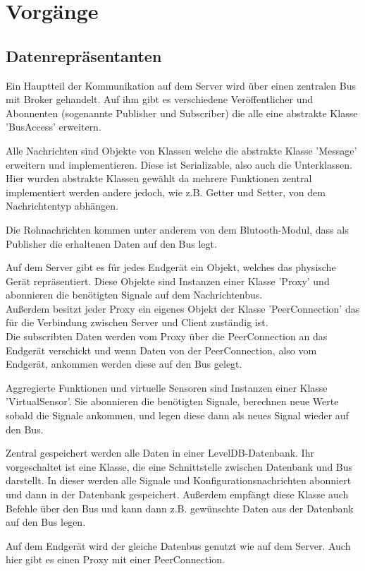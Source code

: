 \documentclass[entwurf.tex]{subfiles}
\begin{document}
\chapter{Vorgänge}
\section{Datenrepräsentanten}
Ein Hauptteil der Kommunikation auf dem Server wird über einen zentralen Bus mit Broker gehandelt. Auf ihm gibt es verschiedene Veröffentlicher und Abonnenten (sogenannte Publisher und Subscriber) die alle  eine abstrakte Klasse 'BusAccess' erweitern.

Alle Nachrichten sind Objekte von Klassen welche die abstrakte Klasse 'Message' erweitern und implementieren. Diese ist Serializable, also auch die Unterklassen. Hier wurden abstrakte Klassen gewählt da mehrere Funktionen zentral implementiert werden andere jedoch, wie z.B. Getter und Setter, von dem Nachrichtentyp abhängen.  

Die Rohnachrichten kommen unter anderem von dem Blutooth-Modul, dass als Publisher die erhaltenen Daten auf den Bus legt.

Auf dem Server gibt es für jedes Endgerät ein Objekt, welches das physische Gerät repräsentiert. Diese Objekte sind Instanzen einer Klasse 'Proxy' und abonnieren die benötigten Signale auf dem Nachrichtenbus. \\
Außerdem besitzt jeder Proxy ein eigenes Objekt der Klasse 'PeerConnection' das für die Verbindung zwischen Server und Client zuständig ist. \\
Die subscribten Daten werden vom Proxy über die PeerConnection an das Endgerät verschickt und wenn Daten von der PeerConnection, also vom Endgerät, ankommen werden diese auf den Bus gelegt.

Aggregierte Funktionen und virtuelle Sensoren sind Instanzen einer Klasse 'VirtualSensor'. Sie abonnieren die benötigten Signale, berechnen neue Werte sobald die Signale ankommen, und legen diese dann als neues Signal wieder auf den Bus. 

Zentral gespeichert werden alle Daten in einer LevelDB-Datenbank. Ihr vorgeschaltet ist eine Klasse, die eine Schnittstelle zwischen Datenbank und Bus darstellt. In dieser werden alle Signale und Konfigurationsnachrichten abonniert und dann in der Datenbank gespeichert. Außerdem empfängt diese Klasse auch Befehle über den Bus und kann dann z.B. gewünschte Daten aus der Datenbank auf den Bus legen.

Auf dem Endgerät wird der gleiche Datenbus genutzt wie auf dem Server. Auch hier gibt es einen Proxy mit einer PeerConnection.
\end{document}
